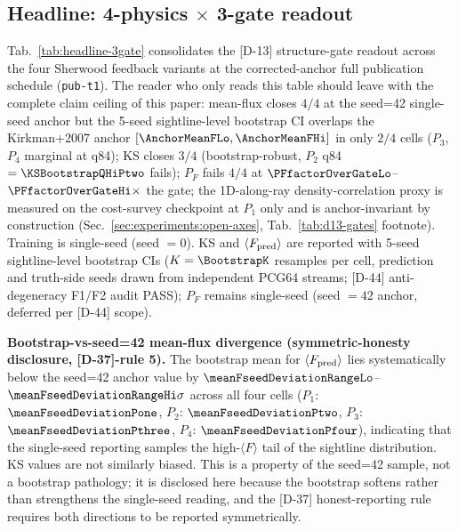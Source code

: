 \subsection{Headline: 4-physics $\times$ 3-gate readout}
\label{sec:experiments:headline}
Tab.~\ref{tab:headline-3gate} consolidates the [D-13] structure-gate readout across the four Sherwood feedback variants at the corrected-anchor full publication schedule (\texttt{pub-t1}). The reader who only reads this table should leave with the complete claim ceiling of this paper: mean-flux closes $4/4$ at the seed=42 single-seed anchor but the 5-seed sightline-level bootstrap CI overlaps the Kirkman+2007 anchor $[\AnchorMeanFLo, \AnchorMeanFHi]$ in only $2/4$ cells ($P_3$, $P_4$ marginal at q84); KS closes $3/4$ (bootstrap-robust, $P_2$ q84 $=\KSBootstrapQHiPtwo$ fails); $P_F$ fails $4/4$ at $\PFfactorOverGateLo$--$\PFfactorOverGateHi\times$ the gate; the 1D-along-ray density-correlation proxy is measured on the cost-survey checkpoint at $P_1$ only and is anchor-invariant by construction (Sec.~\ref{sec:experiments:open-axes}, Tab.~\ref{tab:d13-gates} footnote). Training is single-seed (seed $=0$). KS and $\langle F_{\rm pred}\rangle$ are reported with 5-seed sightline-level bootstrap CIs ($K=\BootstrapK$ resamples per cell, prediction and truth-side seeds drawn from independent PCG64 streams; [D-44] anti-degeneracy F1/F2 audit PASS); $P_F$ remains single-seed (seed $=42$ anchor, deferred per [D-44] scope).

\textbf{Bootstrap-vs-seed=42 mean-flux divergence (symmetric-honesty disclosure, [D-37]-rule 5).} The bootstrap mean for $\langle F_{\rm pred}\rangle$ lies systematically below the seed=42 anchor value by $\meanFseedDeviationRangeLo$--$\meanFseedDeviationRangeHi\sigma$ across all four cells ($P_1$: $\meanFseedDeviationPone$, $P_2$: $\meanFseedDeviationPtwo$, $P_3$: $\meanFseedDeviationPthree$, $P_4$: $\meanFseedDeviationPfour$), indicating that the single-seed reporting samples the high-$\langle F\rangle$ tail of the sightline distribution. KS values are not similarly biased. This is a property of the seed=42 sample, not a bootstrap pathology; it is disclosed here because the bootstrap softens rather than strengthens the single-seed reading, and the [D-37] honest-reporting rule requires both directions to be reported symmetrically.

